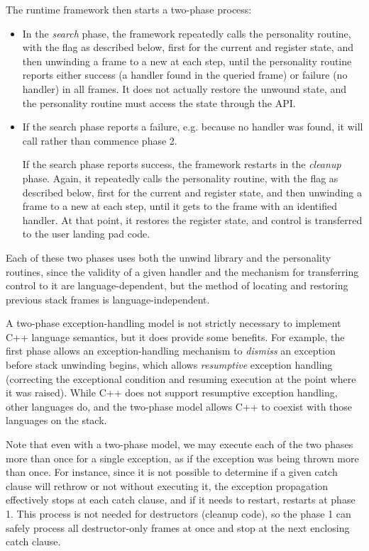 The runtime framework then starts a two-phase process:
\begin{itemize}
\item In the \emph{search} phase, the framework repeatedly calls the
personality routine, with the  flag as
described below, first for the current \RIP and register state, and then
unwinding a frame to a new \RIP at each step, until the personality
routine reports either success (a handler found in the queried frame)
or failure (no handler) in all frames. It does not actually restore the
unwound state, and the personality routine must access the state through
the API.

\item If the search phase reports a failure, e.g. because no handler was
found, it will call  rather than commence phase 2.

If the search phase reports success, the framework restarts in the
\emph{cleanup} phase. Again, it repeatedly calls the personality
routine, with the  flag as described
below, first for the current \RIP and register state, and then unwinding
a frame to a new \RIP at each step, until it gets to the frame with
an identified handler. At that point, it restores the register state,
and control is transferred to the user landing pad code.
\end {itemize}

Each of these two phases uses both the unwind library and the personality
routines, since the validity of a given handler and the mechanism for
transferring control to it are language-dependent, but the method of
locating and restoring previous stack frames is language-independent.

A two-phase exception-handling model is not strictly necessary to
implement C++ language semantics, but it does provide some benefits. For
example, the first phase allows an exception-handling mechanism to
\emph{dismiss} an exception before stack unwinding begins, which allows
\emph{resumptive} exception handling (correcting the exceptional condition
and resuming execution at the point where it was raised). While C++ does
not support resumptive exception handling, other languages do, and the
two-phase model allows C++ to coexist with those languages on the stack.

Note that even with a two-phase model, we may execute each of the two
phases more than once for a single exception, as if the exception was
being thrown more than once. For instance, since it is not possible to
determine if a given catch clause will rethrow or not without executing
it, the exception propagation effectively stops at each catch clause,
and if it needs to restart, restarts at phase 1. This process is not
needed for destructors (cleanup code), so the phase 1 can safely process
all destructor-only frames at once and stop at the next enclosing
catch clause.

